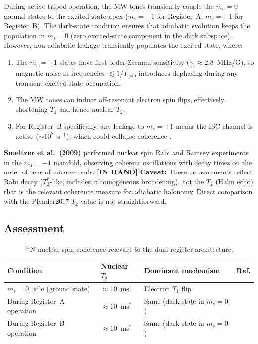\documentclass[11pt,letterpaper]{article}
\newcommand{\inhand}{\textcolor{green!50!black}{\textbf{[IN HAND]}}}
\begin{document}
During active tripod operation, the MW tones transiently couple the $m_s = 0$ ground states to the excited-state apex ($m_s = -1$ for Register~A, $m_s = +1$ for Register~B). The dark-state condition ensures that adiabatic evolution keeps the population in $m_s = 0$ (zero excited-state component in the dark subspace). However, non-adiabatic leakage transiently populates the excited state, where:
\begin{enumerate}[leftmargin=*]
    \item The $m_s = \pm 1$ states have first-order Zeeman sensitivity ($\gamma_e \approx 2.8$~MHz/G), so magnetic noise at frequencies $\lesssim 1/T_\mathrm{loop}$ introduces dephasing during any transient excited-state occupation.
    \item The MW tones can induce off-resonant electron spin flips, effectively shortening $T_1$ and hence nuclear $T_2$.
    \item For Register~B specifically, any leakage to $m_s = +1$ means the ISC channel is active ($\sim 10^8$~s$^{-1}$), which could collapse coherence \cite{Doherty2013}. %
\end{enumerate}

\medskip
\noindent\textbf{Smeltzer et al.\ (2009)} \cite{Smeltzer2009} performed nuclear spin Rabi and Ramsey experiments in the $m_s = -1$ manifold, observing coherent oscillations with decay times on the order of tens of microseconds. \inhand %
\textbf{Caveat:} These measurements reflect Rabi decay ($T_2^*$-like, includes inhomogeneous broadening), not the $T_2$ (Hahn echo) that is the relevant coherence measure for adiabatic holonomy. Direct comparison with the Pfender2017 $T_2$ value is not straightforward.

\subsection{Assessment}

\begin{table}[H]
\centering
\caption{$^{14}$N nuclear spin coherence relevant to the dual-register architecture.}
\label{tab:t2_comparison}
\begin{tabular}{@{}llll@{}}
\toprule
\textbf{Condition} & \textbf{Nuclear $T_2$} & \textbf{Dominant mechanism} & \textbf{Ref.} \\
\midrule
$m_s = 0$, idle (ground state) & $\approx 10$~ms & Electron $T_1$ flip & \cite{Pfender2017} \\
During Register~A operation & $\approx 10$~ms$^*$ & Same (dark state in $m_s = 0$) & \cite{Pfender2017} \\
During Register~B operation & $\approx 10$~ms$^*$ & Same (dark state in $m_s = 0$) & \cite{Pfender2017} \\
\bottomrule
\end{tabular}
\end{table}
\end{document}
